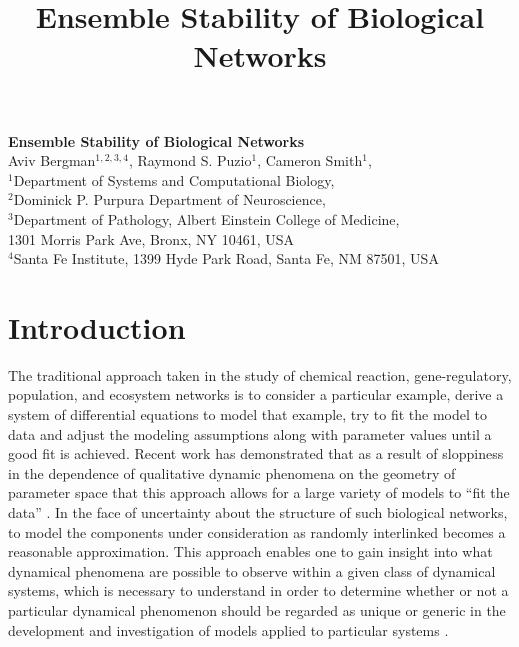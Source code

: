 



\let\ref\autoref

\title{Ensemble Stability of Biological Networks}


\begin{center}
{\Large
\textbf{Ensemble Stability of Biological Networks}
}
\\[.5cm]
Aviv Bergman$^{1,2,3,4}$,
Raymond S. Puzio$^{1}$,
Cameron Smith$^{1}$,
\\[.5cm]
$^1$Department of Systems and Computational Biology,\\
$^2$Dominick P. Purpura Department of Neuroscience,\\
$^3$Department of Pathology, Albert Einstein College of Medicine,\\
1301 Morris Park Ave, Bronx, NY 10461, USA\\
$^4$Santa Fe Institute, 1399 Hyde Park Road, Santa Fe, NM 87501, USA
\\[.5cm]
\end{center}

{\begin{quote} \bf

\end{quote}}


\section{Introduction}

The traditional approach taken in the study of chemical reaction, gene-regulatory, population, and ecosystem networks is to consider a particular example, derive a system of differential equations to model that example, try to fit the model to data and adjust the modeling assumptions along with parameter values until a good fit is achieved. Recent work has demonstrated that as a result of sloppiness in the dependence of qualitative dynamic phenomena on the geometry of parameter space that this approach allows for a large variety of models to ``fit the data'' \cite{Brown2003,Gutenkunst2007,Daniels2008a,Machta2013,Hines2014,Prabakaran2014}. In the face of uncertainty about the structure of such biological networks, to model the components under consideration as randomly interlinked becomes a reasonable approximation. This approach enables one to gain insight into what dynamical phenomena are possible to observe within a given class of dynamical systems, which is necessary to understand in order to determine whether or not a particular dynamical phenomenon should be regarded as unique or generic in the development and investigation of models applied to particular systems \cite{Gunawardena2013,Gunawardena2014}.

